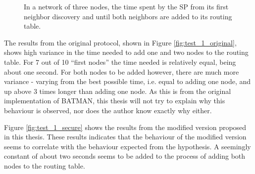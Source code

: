 \begin{figure}[h]
	\centering
	\caption{In a network of three nodes, the time spent by the \ac{SP} from its first neighbor discovery and until both neighbors are added to its routing table.}
	\label{fig:results_test_1}
\end{figure}

The results from the original protocol, shown in Figure
\ref{fig:test_1_original}, shows high variance in the time needed to add one and
two nodes to the routing table. For 7 out of 10 ``first nodes'' the time needed
is relatively equal, being about one second. For both nodes to be added however,
there are much more variance - varying from the best possible time, i.e. equal
to adding one node, and up above 3 times longer than adding one node. As this is
from the original implementation of BATMAN, this thesis will not try to explain
why this behaviour is observed, nor does the author know exactly why either.

Figure \ref{fig:test_1_secure} shows the results from the modified version
proposed in this thesis. These results indicates that the behaviour of the
modified version seems to correlate with the behaviour expected from the
hypothesis. A seemingly constant of about two seconds seems to be added to the
process of adding both nodes to the routing table. 

